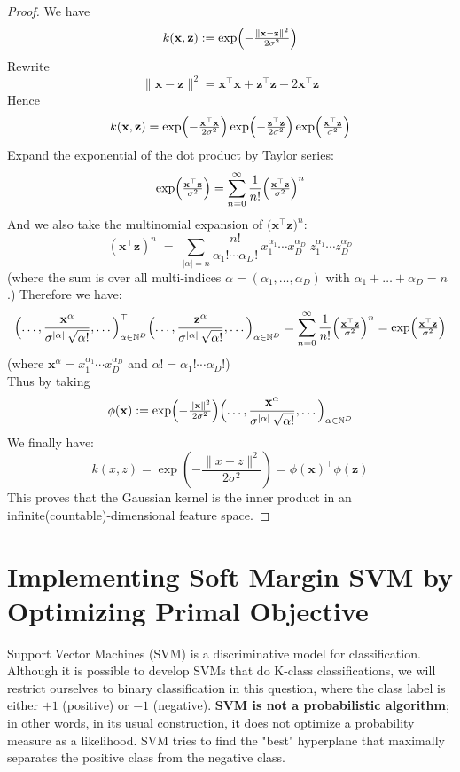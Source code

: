 \documentclass[lang=cn,11pt]{elegantbook}
\begin{document}
\begin{proof}
We have \[
  k(\mathbf{x}, \mathbf{z}) := \exp\Bigl(-\tfrac{\|\mathbf{x} - \mathbf{z}\|^2}{2\sigma^2}\Bigr)
\]Rewrite \[    \|\mathbf{x}-\mathbf{z}\|^2 
       = \mathbf{x}^\top\mathbf{x} + \mathbf{z}^\top\mathbf{z}   - 2\mathbf{x}^\top\mathbf{z}
   \]Hence\[
     k(\mathbf{x}, \mathbf{z})= \exp\Bigl(-\tfrac{\mathbf{x}^\top \mathbf{x}}{2\sigma^2}\Bigr)
           \exp\Bigl(-\tfrac{\mathbf{z}^\top \mathbf{z}}{2\sigma^2}\Bigr)
\exp\Bigl(\tfrac{\mathbf{x}^\top \mathbf{z}}{\sigma^2}\Bigr)
   \]Expand the exponential of the dot product by Taylor series:\[
     \exp\Bigl(\tfrac{\mathbf{x}^\top\mathbf{z}}{\sigma^2}\Bigr) = \sum_{n=0}^{\infty} \frac{1}{n!}\Bigl(\tfrac{\mathbf{x}^\top \mathbf{z}}{\sigma^2}\Bigr)^n
   \]
And we also take the multinomial expansion of \(\bigl(\mathbf{x}^\top \mathbf{z}\bigr)^n\): \[
     (\mathbf{x}^\top \mathbf{z})^n
     \;=\; \sum_{|\alpha|=n} \frac{n!}{\alpha_1!\cdots \alpha_D!}\, 
           x_1^{\alpha_1}\cdots x_D^{\alpha_D}\;
           z_1^{\alpha_1}\cdots z_D^{\alpha_D}
   \]
(where the sum is over all multi-indices \(\alpha = (\alpha_1,\dots,\alpha_D)\) with \(\alpha_1 + \dots + \alpha_D = n\).)
Therefore we have: \[      \Bigl(\dots, \frac{\mathbf{x}^\alpha}{\sigma^{|\alpha|}\,\sqrt{\alpha!}},
               \dots\Bigr)_{\alpha\in \mathbb{N}^D} ^\top   \Bigl(\dots, \frac{\mathbf{z}^\alpha}{\sigma^{|\alpha|}\,\sqrt{\alpha!}},
               \dots\Bigr)_{\alpha\in \mathbb{N}^D} =  \sum_{n=0}^{\infty} \frac{1}{n!}\Bigl(\tfrac{\mathbf{x}^\top \mathbf{z}}{\sigma^2}\Bigr)^n =   \exp\Bigl(\tfrac{\mathbf{x}^\top\mathbf{z}}{\sigma^2}\Bigr) 
\]
(where \(\mathbf{x}^\alpha = x_1^{\alpha_1} \cdots x_D^{\alpha_D}\) and \(\alpha! = \alpha_1!\cdots \alpha_D!\))\\
Thus by taking \[
  \phi(\mathbf{x}) :=\exp\Bigl(-\tfrac{\|\mathbf{x}\|^2}{2\sigma^2}\Bigr)
        \Bigl(\dots,\frac{\mathbf{x}^\alpha}{\sigma^{|\alpha|}\,\sqrt{\alpha!}},
               \dots\Bigr)_{\alpha\in \mathbb{N}^D}
\]
We finally have: 
\[  k(x, z) = \exp \left( -\frac{\|x - z\|^2}{2\sigma^2} \right) =   \phi(\mathbf{x})^\top\phi(\mathbf{z}) \]
This proves that the Gaussian kernel is the inner product in an infinite(countable)-dimensional feature space.
\end{proof}




\section{Implementing Soft Margin SVM by Optimizing Primal Objective}
Support Vector Machines (SVM) is a discriminative model for classification. Although it is possible to develop SVMs that do K-class classifications, we will restrict ourselves to binary classification in this question, where the class label is either $+1$ (positive) or $-1$ (negative). \textbf{SVM is not a probabilistic algorithm}; in other words, in its usual construction, it does not optimize a probability measure as a likelihood. SVM tries to find the "best" hyperplane that maximally separates the positive class from the negative class.
\end{document}
